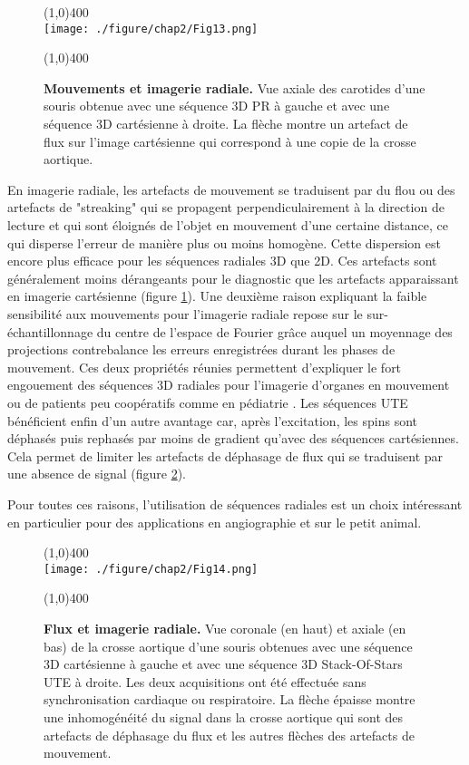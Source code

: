 \begin{figure}[h]
\centering
\line(1,0){400} \\
\texttt{[image: ./figure/chap2/Fig13.png]}
\caption[Mouvements et imagerie radiale.]{\label{fig:MotionArt} \textbf{Mouvements et imagerie radiale.} Vue axiale des carotides d'une souris obtenue avec une séquence 3D PR à gauche et avec une séquence 3D cartésienne à droite. La flèche montre un artefact de flux sur l'image cartésienne qui correspond à une copie de la crosse aortique.}
\line(1,0){400} \\
\end{figure}

En imagerie radiale, les artefacts de mouvement se traduisent par du flou ou des artefacts de "streaking" qui se propagent perpendiculairement à la direction de lecture et qui sont éloignés de l'objet en mouvement d'une certaine distance, ce qui disperse l'erreur de manière plus ou moins homogène. Cette dispersion est encore plus efficace pour les séquences radiales 3D que 2D. Ces artefacts sont généralement moins dérangeants pour le diagnostic que les artefacts apparaissant en imagerie cartésienne (figure \ref{fig:MotionArt}).
Une deuxième raison expliquant la faible sensibilité aux mouvements pour l'imagerie radiale repose sur le sur-échantillonnage du centre de l'espace de Fourier grâce auquel un moyennage des projections contrebalance les erreurs enregistrées durant les phases de mouvement.
Ces deux propriétés réunies permettent d'expliquer le fort engouement des séquences 3D radiales pour l'imagerie d'organes en mouvement ou de patients peu coopératifs comme en pédiatrie \cite{block2014towards,Nayak:2014aa}.
Les séquences UTE bénéficient enfin d'un autre avantage car, après l'excitation, les spins sont déphasés puis rephasés par moins de gradient qu'avec des séquences cartésiennes. Cela permet de limiter les artefacts de déphasage de flux qui se traduisent par une absence de signal (figure \ref{fig:FluxArt}).

Pour toutes ces raisons, l'utilisation de séquences radiales est un choix intéressant en particulier pour des applications en angiographie et sur le petit animal. 
\begin{figure}[H]
\centering
\line(1,0){400} \\
\texttt{[image: ./figure/chap2/Fig14.png]}
\caption[Flux et imagerie radiale.]{\label{fig:FluxArt} \textbf{Flux et imagerie radiale.} Vue coronale (en haut) et axiale (en bas) de la crosse aortique d'une souris obtenues avec une séquence 3D cartésienne à gauche et avec une séquence 3D Stack-Of-Stars UTE à droite. Les deux acquisitions ont été effectuée sans synchronisation cardiaque ou respiratoire. La flèche épaisse montre une inhomogénéité du signal dans la crosse aortique qui sont des artefacts de déphasage du flux et les autres flèches  des artefacts de mouvement.}
\line(1,0){400} \\
\end{figure}

